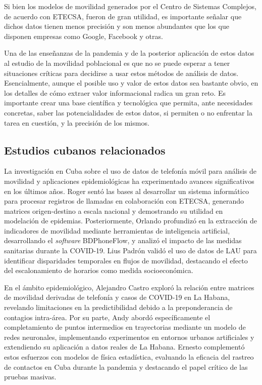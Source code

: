 Si bien los modelos de movilidad generados por el Centro de Sistemas Complejos, de acuerdo con ETECSA, fueron de gran utilidad, es importante señalar que dichos datos tienen menos precisión y son menos abundantes que los que disponen empresas como Google, Facebook y otras.

Una de las enseñanzas de la pandemia y de la posterior aplicación de estos datos al estudio de la movilidad poblacional es que no se puede esperar a tener situaciones críticas para decidirse a usar estos métodos de análisis de datos. Esencialmente, aunque el posible uso y valor de estos datos sea bastante obvio, en los detalles de cómo extraer valor informacional radica un gran reto. Es importante crear una base científica y tecnológica que permita, ante necesidades concretas, saber las potencialidades de estos datos, si permiten o no enfrentar la tarea en cuestión, y la precisión de los mismos.

\subsection{Estudios cubanos relacionados}

La investigación en Cuba sobre el uso de datos de telefonía móvil para análisis de movilidad y aplicaciones epidemiológicas ha experimentado avances significativos en los últimos años. Roger \cite{casimiro2019movilidad} sentó las bases al desarrollar un sistema informático para procesar registros de llamadas en colaboración con ETECSA, generando matrices origen-destino a escala nacional y demostrando su utilidad en modelación de epidemias. Posteriormente, Orlando \cite{durive2021sistema} profundizó en la extracción de indicadores de movilidad mediante herramientas de inteligencia artificial, desarrollando el \textit{software} BDPhoneFlow, y analizó el impacto de las medidas sanitarias durante la COVID-19. Lius Padrón \cite{padron2021transporte} validó el uso de datos de LAU para identificar disparidades temporales en flujos de movilidad, destacando el efecto del escalonamiento de horarios como medida socioeconómica.

En el ámbito epidemiológico, Alejandro Castro \cite{castro2023movilidad} exploró la relación entre matrices de movilidad derivadas de telefonía y casos de COVID-19 en La Habana, revelando limitaciones en la predictibilidad debido a la preponderancia de contagios intra-área. Por su parte, Andy \cite{rodriguez2022movilidad} abordó específicamente el completamiento de puntos intermedios en trayectorias mediante un modelo de redes neuronales, implementando experimentos en entornos urbanos artificiales y extendiendo su aplicación a datos reales de La Habana. Ernesto \cite{ortega2022modelacion} complementó estos esfuerzos con modelos de física estadística, evaluando la eficacia del rastreo de contactos en Cuba durante la pandemia y destacando el papel crítico de las pruebas masivas.

